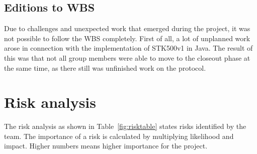 \subsection{Editions to WBS}
Due to challenges and unexpected work that emerged during the project, it was not possible to follow the WBS completely. First of all, a lot of unplanned work arose in connection with the implementation of STK500v1 in Java. The result of this was that not all group members were able to move to the closeout phase at the same time, as there still was unfinished work on the protocol.

\section{Risk analysis}
The risk analysis as shown in Table~\ref{fig:risktable} states risks identified by the team. The importance of a risk is calculated by multiplying likelihood and impact. Higher numbers means higher importance for the project.

